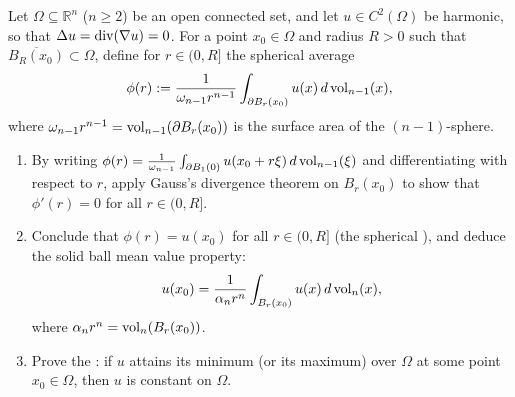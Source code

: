 \begin{exercise}
\label{ex:harmonic_mean_value_maximum_principle}
Let $\Omega \subseteq \mathbb{R}^n$ ($n \geq 2$) be an open connected set, and let $u \in C^2(\Omega)$
be harmonic, so that $\Delta u = \operatorname{div}(\nabla u) = 0$.
For a point $x_0 \in \Omega$ and radius $R > 0$ such that $\overline{B_R(x_0)} \subset \Omega$, define
for $r \in (0, R]$ the spherical average
\[
\phi(r) := \frac{1}{\omega_{n-1} r^{n-1}} \int_{\partial B_r(x_0)} u(x) \, d\operatorname{vol}_{n-1}(x),
\]
where $\omega_{n-1} r^{n-1} = \operatorname{vol}_{n-1}(\partial B_r(x_0))$ is the surface area of the $(n{-}1)$-sphere.
\begin{enumerate}[label=\textbf{(\alph*)}]
  \item By writing $\phi(r) = \frac{1}{\omega_{n-1}} \int_{\partial B_1(0)} u(x_0 + r\xi) \, d\operatorname{vol}_{n-1}(\xi)$
    and differentiating with respect to $r$, apply Gauss's divergence theorem on $B_r(x_0)$ to show that
    $\phi'(r) = 0$ for all $r \in (0, R]$.
  \item Conclude that $\phi(r) = u(x_0)$ for all $r \in (0, R]$ (the spherical ),
    and deduce the solid ball mean value property:
    \[
    u(x_0) = \frac{1}{\alpha_n r^n} \int_{B_r(x_0)} u(x) \, d\operatorname{vol}_n(x),
    \]
    where $\alpha_n r^n = \operatorname{vol}_n(B_r(x_0))$.
  \item Prove the : if $u$ attains its minimum (or its maximum)
    over $\Omega$ at some point $x_0 \in \Omega$, then $u$ is constant on $\Omega$.
\end{enumerate}
\end{exercise}

